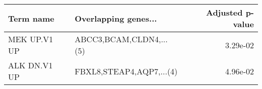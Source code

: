 \begin{tabular}{llr}
\toprule
   Term name &     Overlapping genes... &  Adjusted p-value \\
\midrule
MEK UP.V1 UP &  ABCC3,BCAM,CLDN4,...(5) &          3.29e-02 \\
ALK DN.V1 UP & FBXL8,STEAP4,AQP7,...(4) &          4.96e-02 \\
\bottomrule
\end{tabular}
